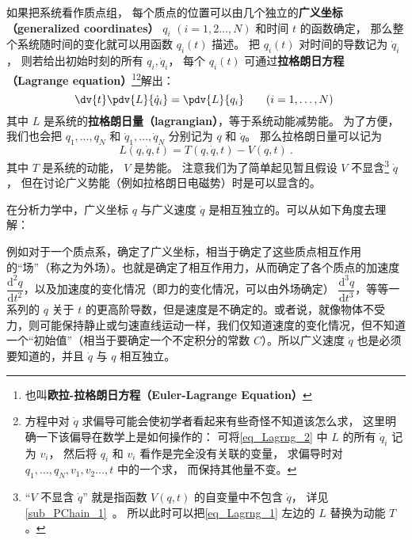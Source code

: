 

如果把系统看作质点组， 每个质点的位置可以由几个独立的\textbf{广义坐标（generalized coordinates）} $q_i$ $(i=1,2\dots,N)$ 和时间 $t$ 的函数确定， 那么整个系统随时间的变化就可以用函数 $q_i(t)$ 描述。 把 $q_i(t)$ 对时间的导数记为 $\dot q_i$， 则若给出初始时刻的所有 $q_i, \dot q_i$， 每个 $q_i(t)$ 可通过\textbf{拉格朗日方程（Lagrange equation）}\footnote{也叫\textbf{欧拉-拉格朗日方程（Euler-Lagrange Equation）}}\footnote{方程中对 $\dot q$ 求偏导可能会使初学者看起来有些奇怪不知道该怎么求， 这里明确一下该偏导在数学上是如何操作的： 可将\autoref{eq_Lagrng_2} 中 $L$ 的所有 $\dot q_i$ 记为 $v_i$， 然后将 $q_i$ 和 $v_i$ 看作是完全没有关联的变量， 求偏导时对 $q_1,\dots, q_N, v_1, v_2\dots,t$ 中的一个求， 而保持其他量不变。}解出：
\begin{equation}\label{eq_Lagrng_1}
\dv{t} \pdv{L}{\dot q_i} = \pdv{L}{q_i}
\qquad (i=1,\dots,N)~
\end{equation}
其中 $L$ 是系统的\textbf{拉格朗日量（lagrangian）}，等于系统动能减势能。 为了方便， 我们也会把 $q_1, \dots, q_N$ 和 $\dot q_1,\dots,\dot q_N$ 分别记为 $q$ 和 $\dot q$。 那么拉格朗日量可以记为
\begin{equation}\label{eq_Lagrng_2}
L(q, \dot q, t) = T(q, \dot q, t) - V(q, t)~.
\end{equation}
其中 $T$ 是系统的动能， $V$ 是势能。 注意我们为了简单起见暂且假设 $V$ 不显含\footnote{“$V$ 不显含 $\dot q$” 就是指函数 $V(q,t)$ 的自变量中不包含 $\dot q$， 详见\autoref{sub_PChain_1}~。 所以此时可以把\autoref{eq_Lagrng_1} 左边的 $L$ 替换为动能 $T$。} $\dot q$， 但在讨论广义势能（例如拉格朗日电磁势）时是可以显含的。

在分析力学中，广义坐标 $q$ 与广义速度 $\dot q$ 是相互独立的。可以从如下角度去理解：

例如对于一个质点系，确定了广义坐标，相当于确定了这些质点相互作用的“场”（称之为外场）。也就是确定了相互作用力，从而确定了各个质点的加速度 $\dfrac{\text{d}^2 q}{\text{d} t^2}$，以及加速度的变化情况（即力的变化情况，可以由外场确定） $\dfrac{\text{d}^3 q}{\text{d} t^3}$，等等一系列的 $q$ 关于 $t$ 的更高阶导数，但是速度是不确定的。或者说，就像物体不受力，则可能保持静止或匀速直线运动一样，我们仅知道速度的变化情况，但不知道一个“初始值”（相当于要确定一个不定积分的常数 $C$）。所以广义速度 $\dot q$ 也是必须要知道的，并且 $\dot q$ 与 $q$ 相互独立。


